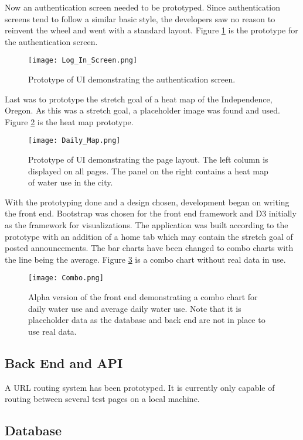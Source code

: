 \documentclass[journal]{IEEEtran}
\begin{document}
Now an authentication screen needed to be prototyped. Since authentication screens tend to follow a similar basic style, the developers saw no reason to reinvent the wheel and went with a standard layout. Figure \ref{fig:logon} is the prototype for the authentication screen.

\begin{figure}[H]
  \texttt{[image: Log\_In\_Screen.png]}
  \caption{Prototype of UI demonstrating the authentication screen.}
  \label{fig:logon}
\end{figure}

Last was to prototype the stretch goal of a heat map of the Independence, Oregon. As this was a stretch goal, a placeholder image was found and used. Figure \ref{fig:heatmap} is the heat map prototype.

\begin{figure}[H]
  \texttt{[image: Daily\_Map.png]}
  \caption{Prototype of UI demonstrating the page layout. The left column is displayed on all pages. The panel on the right contains a heat map of water use in the city.}
  \label{fig:heatmap}
\end{figure}

With the prototyping done and a design chosen, development began on writing the front end. Bootstrap was chosen for the front end framework and D3 initially as the framework for visualizations. The application was built according to the prototype with an addition of a home tab which may contain the stretch goal of posted announcements. The bar charts have been changed to combo charts with the line being the average. Figure \ref{fig:combo} is a combo chart without real data in use.

\begin{figure}[H]
  \texttt{[image: Combo.png]}
  \caption{Alpha version of the front end demonstrating a combo chart for daily water use and average daily water use. Note that it is placeholder data as the database and back end are not in place to use real data.}
  \label{fig:combo}
\end{figure}

\subsection{Back End and API}
A URL routing system has been prototyped. It is currently only capable of routing between several test pages on a local machine.
 	
\subsection{Database}
\end{document}
